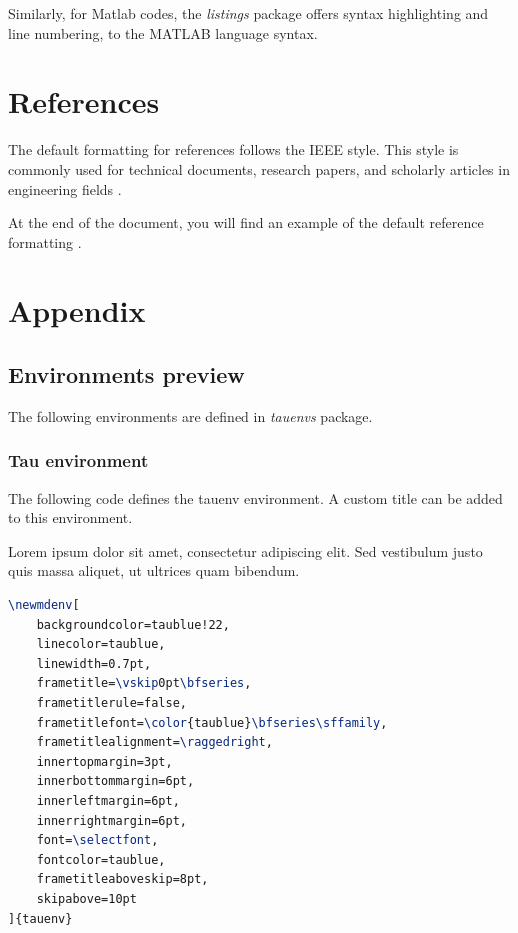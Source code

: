 \documentclass[9pt,a4paper,twoside]{tau}
\begin{document}
    

    Similarly, for Matlab codes, the \textit{listings} package offers syntax highlighting and line numbering, to the MATLAB language syntax.
    
    

\section{References}

    The default formatting for references follows the IEEE style. This style is commonly used for technical documents, research papers, and scholarly articles in engineering fields \cite{einstein}.

    At the end of the document, you will find an example of the default reference formatting \cite{dirac}.
        
\section{Appendix}

    \subsection{Environments preview}

        The following environments are defined in \textit{tauenvs} package.
		
		\subsubsection{Tau environment}

                The following code defines the tauenv environment. A custom title can be added to this environment.

			\begin{tauenv}[frametitle=Tauenv]
                    Lorem ipsum dolor sit amet, consectetur adipiscing elit. Sed vestibulum justo quis massa aliquet, ut ultrices quam bibendum.
			\end{tauenv}
		
\begin{lstlisting}[language=TeX, caption=Tauenv environment code.]
\newmdenv[
	backgroundcolor=taublue!22, 					
	linecolor=taublue,									
	linewidth=0.7pt,
	frametitle=\vskip0pt\bfseries,
	frametitlerule=false,
	frametitlefont=\color{taublue}\bfseries\sffamily,
	frametitlealignment=\raggedright,
	innertopmargin=3pt,
	innerbottommargin=6pt,
	innerleftmargin=6pt,
	innerrightmargin=6pt,
	font=\selectfont,
	fontcolor=taublue,									
	frametitleaboveskip=8pt,
	skipabove=10pt
]{tauenv} \end{lstlisting}
		
\end{document}
